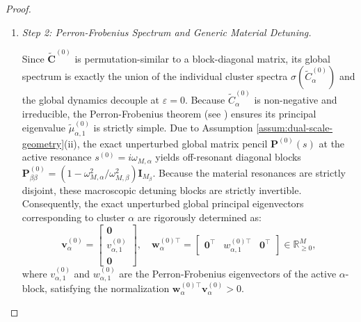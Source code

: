 \documentclass[11pt,a4paper]{article}
\numberwithin{equation}{section}
\begin{document}
\begin{proof}
\begin{enumerate}
\medskip
\noindent
The perturbation matrix $\mathbf{\Gamma}^{(1)}$ contains both the intra-cluster radiation matrices (in the diagonal blocks) and the macroscopic inter-cluster wave interactions (in the off-diagonal blocks), evaluated at $i\omega_{M,\alpha}$:
$$ [\mathbf{\Gamma}^{(1)}]_{\gamma\gamma} = C_\gamma^{(1)}, \quad [\mathbf{\Gamma}^{(1)}]_{\gamma\beta} = i G_{\gamma\beta}(i\omega_{M,\alpha}) \quad (\text{for } \gamma \neq \beta), $$
with $G_{\gamma\beta, ij} = \overline{\mathcal{C}}_j \frac{e^{-ik_{M,\alpha} D_{ij}}}{4\pi D_{ij}}$ where the wavenumber is $k_{M,\alpha} = \omega_{M,\alpha}/{c_0}$.

\item \textit{Step 2: Perron-Frobenius Spectrum and Generic Material Detuning.}

\medskip
\noindent
Since $\widetilde{\mathbf{C}}^{(0)}$ is permutation-similar to a block-diagonal matrix, its global spectrum is exactly the union of the individual cluster spectra $\sigma(\widetilde{C}_\alpha^{(0)})$ and the global dynamics decouple at $\varepsilon = 0$. Because $\widetilde{C}_\alpha^{(0)}$ is non-negative and irreducible, the Perron-Frobenius theorem (see \cite[Ch. 8, Th. 8.4.4]{la1}) ensures its principal eigenvalue $\widetilde{\mu}_{\alpha, 1}^{(0)}$ is strictly simple. 
\newline
Due to Assumption \ref{assum:dual-scale-geometry}(ii), the exact unperturbed global matrix pencil $\mathbf{P}^{(0)}(s)$ at the active resonance $s^{(0)} = i\omega_{M,\alpha}$ yields off-resonant diagonal blocks $\mathbf{P}_{\beta\beta}^{(0)} = \left( 1 - \omega_{M,\alpha}^2/\omega_{M,\beta}^2 \right) \mathbf{I}_{M_\beta}$. Because the material resonances are strictly disjoint, these macroscopic detuning blocks are strictly invertible. Consequently, the exact unperturbed global principal eigenvectors corresponding to cluster $\alpha$ are rigorously determined as:
$$\mathbf{v}_\alpha^{(0)} = \begin{bmatrix} \mathbf{0} \\ v_{\alpha, 1}^{(0)} \\ \mathbf{0} \end{bmatrix}, \quad \mathbf{w}_\alpha^{(0)\top} = \begin{bmatrix} \mathbf{0}^\top & w_{\alpha, 1}^{(0)\top} & \mathbf{0}^\top \end{bmatrix} \in \mathbb{R}_{\ge 0}^M,$$
where $v_{\alpha, 1}^{(0)}$ and $w_{\alpha, 1}^{(0)}$ are the Perron-Frobenius eigenvectors of the active $\alpha$-block, satisfying the normalization $\mathbf{w}_\alpha^{(0)\top} \mathbf{v}_\alpha^{(0)} > 0$.



\end{enumerate}
\end{proof}
\end{document}
